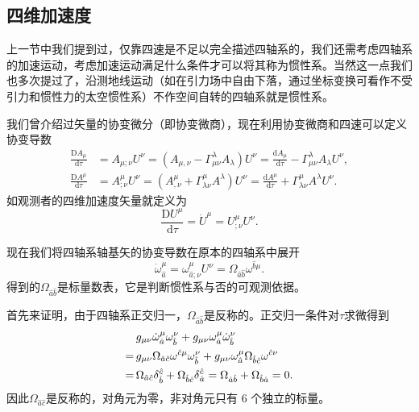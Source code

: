 \documentclass[11pt, a4paper, oneside, onecolumn]{ctexart}
\numberwithin{equation}{subsection}
\begin{document}
\subsection{四维加速度}
上一节中我们提到过，仅靠四速是不足以完全描述四轴系的，我们还需考虑四轴系的加速运动，考虑加速运动满足什么条件才可以将其称为惯性系。当然这一点我们也多次提过了，沿测地线运动（如在引力场中自由下落，通过坐标变换可看作不受引力和惯性力的太空惯性系）不作空间自转的四轴系就是惯性系。

我们曾介绍过矢量的协变微分（即协变微商），现在利用协变微商和四速可以定义协变导数
\begin{align}
\frac{\mathrm{D}A_{\mu}}{\mathrm{d}\tau}&=A_{\mu;\nu}U^{\nu}=\left(A_{\mu,\nu}-\Gamma_{\mu\nu}^{\lambda}A_{\lambda}\right)U^{\nu}=\frac{\mathrm{d}A_{\mu}}{\mathrm{d}\tau}-\Gamma^{\lambda}_{\mu\nu}A_{\lambda}U^{\nu},\\
\frac{\mathrm{D}A^{\mu}}{\mathrm{d}\tau}&=A^{\mu}_{;\nu}U^{\nu}=\left(A^{\mu}_{,\nu}+\Gamma^{\mu}_{\lambda\nu}A^{\lambda}\right)U^{\nu}=\frac{\mathrm{d}A^{\mu}}{\mathrm{d}\tau}+\Gamma^{\mu}_{\lambda\nu}A^{\lambda}U^{\nu}.
\end{align}
如观测者的四维加速度矢量就定义为
\begin{equation}
\dfrac{\mathrm{D}U^{\mu}}{\mathrm{d}\tau}=\dot{U}^{\mu}=U^{\mu}_{;\nu}U^{\nu}.
\end{equation}

现在我们将四轴系轴基矢的协变导数在原本的四轴系中展开
\begin{equation}
\dot{\omega}^{\mu}_{\hat{a}}=\omega^{\mu}_{\hat{a};\nu}U^{\nu}=\Omega_{\hat{a}\hat{b}}\omega^{\hat{b}\mu}.
\end{equation}
得到的$\Omega_{\hat{a}\hat{b}}$是标量数表，它是判断惯性系与否的可观测依据。

首先来证明，由于四轴系正交归一，$\Omega_{\hat{a}\hat{b}}$是反称的。正交归一条件对$\tau$求微得到
\begin{align}
&g_{\mu\nu}\dot{\omega}^{\mu}_{\hat{a}}\omega^{\nu}_{\hat{b}}+g_{\mu\nu}\omega^{\mu}_{\hat{a}}\dot{\omega}^{\nu}_{\hat{b}}\notag\\
=\,&g_{\mu\nu}\Omega_{\hat{a}\hat{c}}\omega^{\hat{c}\mu}\omega^{\nu}_{\hat{b}}+g_{\mu\nu}\omega^{\mu}_{\hat{a}}\Omega_{\hat{b}\hat{c}}\omega^{\hat{c}\nu}\notag\\
=\,&\Omega_{\hat{a}\hat{c}}\delta{}^{\hat{c}}_{\hat{b}}+\Omega_{\hat{b}\hat{c}}\delta{}^{\hat{c}}_{\hat{a}}=\Omega_{\hat{a}\hat{b}}+\Omega_{\hat{b}\hat{a}}=0.
\end{align}
因此$\Omega_{\hat{a}\hat{c}}$是反称的，对角元为零，非对角元只有 6 个独立的标量。
\end{document}
